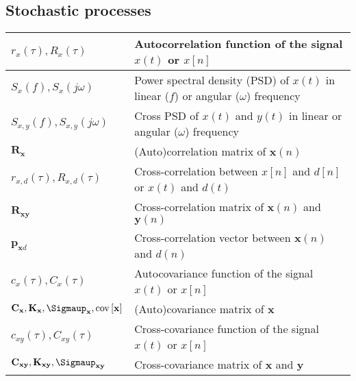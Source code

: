 \documentclass{article}
\begin{document}
\subsection{Stochastic processes}
\begin{xltabular}{\textwidth}{XX}
    \(r_x(\tau), R_x(\tau)\)                                                                                                        & Autocorrelation function of the signal \(x(t)\) or \(x[n]\) \cite{nossekAdaptiveArraySignal2015}\\ \hline
    \(S_x(f), S_x(j\omega)\)                                                                                                        & Power spectral density (PSD) of \(x(t)\) in linear (\(f\)) or angular (\(\omega\)) frequency\\ \hline
    \(S_{x,y}(f), S_{x,y}(j\omega)\)                                                                                                & Cross PSD of \(x(t)\) and \(y(t)\) in linear or angular (\(\omega\)) frequency\\ \hline
    \(\mathbf{R}_\mathbf{x}\)                                                                                                       & (Auto)correlation matrix of \(\mathbf{x}(n)\) \\ \hline
    \(r_{x,d}(\tau), R_{x,d}(\tau)\)                                                                                                & Cross-correlation between \(x[n]\) and \(d[n]\) or \(x(t)\) and \(d(t)\) \cite{nossekAdaptiveArraySignal2015}\\ \hline
    \(\mathbf{R}_\mathbf{xy}\)                                                                                                      & Cross-correlation matrix of \(\mathbf{x}(n)\) and \(\mathbf{y}(n)\)\\ \hline
    \(\mathbf{p}_{\mathbf{x}d}\)                                                                                                    & Cross-correlation vector between \(\mathbf{x}(n)\) and \(d(n)\) \cite{dinizAdaptiveFiltering1997} \\ \hline
    \(c_x(\tau), C_x(\tau)\)                                                                                                        & Autocovariance function of the signal \(x(t)\) or \(x[n]\) \cite{nossekAdaptiveArraySignal2015}\\ \hline
    \(\mathbf{C}_\mathbf{x}, \mathbf{K}_\mathbf{x}, \boldsymbol{\Sigmaup}_\mathbf{x}, \textnormal{cov}\left[ \mathbf{x} \right]\)   & (Auto)covariance matrix of \(\mathbf{x}\) \cite{vantreesOptimumArrayProcessing2002,proakisDigitalCommunications2007,leon-garciaProbabilityStatisticsRandom2007,haykinAdaptiveFilterTheory2002} \\ \hline
    \(c_{xy}(\tau), C_{xy}(\tau)\)                                                                                                  & Cross-covariance function of the signal \(x(t)\) or \(x[n]\) \cite{nossekAdaptiveArraySignal2015} \\ \hline
    \(\mathbf{C}_{\mathbf{xy}}, \mathbf{K}_{\mathbf{xy}}, \boldsymbol{\Sigmaup}_{\mathbf{xy}}\)                                     & Cross-covariance matrix of \(\mathbf{x}\) and \(\mathbf{y}\)
\end{xltabular}
\end{document}
